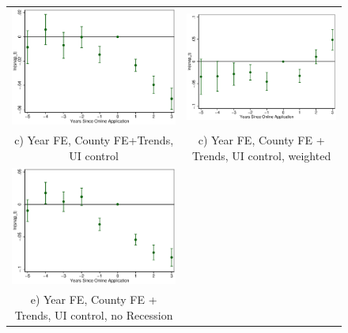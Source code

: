 \documentclass[11pt,letterpaper]{article}
\begin{document}
\begin{figure}
\begin{tabular}{cc}
\includegraphics[scale=0.57]{tabfig/evstu_snap_t_one_yrcfcttru_5_3}&\includegraphics[scale=0.57]{tabfig/evstu_snap_t_total_pop_yrcfcttru_5_3}\\
c) Year FE, County FE+Trends, UI control& c) Year FE, County FE + Trends, UI control, weighted\\
\includegraphics[scale=0.57]{tabfig/evstu_snap_t_one_yrcfcttrunor_5_3}\\
e) Year FE, County FE + Trends, UI control, no Recession\\
\end{tabular}
\end{figure}
\end{document}
